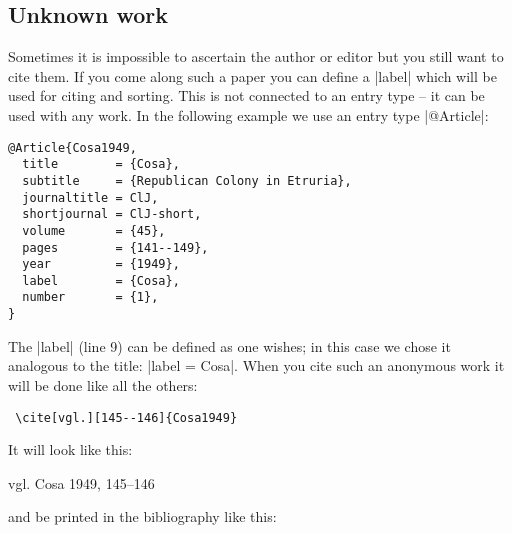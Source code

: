 \documentclass[a4paper,
10pt,
greek,
french,
spanish,
italian,
ngerman,
english
]{ltxdoc}
\begin{document}
\subsection{Unknown work}\label{unknown}
Sometimes it is impossible to ascertain the author or editor but you still want to cite them.
If you come along such a paper you can define a |label| which will be used for citing and sorting.
This is not connected to an entry type -- it can be used with any work.
In the following example we use an entry type |@Article|:
\begin{lstlisting}[style=bibentry,label=Cosa1949,caption={{@}Article\{Cosa1949,…\} }]
@Article{Cosa1949,
  title        = {Cosa},
  subtitle     = {Republican Colony in Etruria},
  journaltitle = ClJ,
  shortjournal = ClJ-short,
  volume       = {45},
  pages        = {141--149},
  year         = {1949},
  label        = {Cosa},
  number       = {1},
}
\end{lstlisting}
 The |label| (line 9) can be defined as one wishes; in this case we chose it analogous to the title: |label = {Cosa}|.
When you cite such an anonymous work it will be done like all the others:
\begin{lstlisting}
 \cite[vgl.][145--146]{Cosa1949}
\end{lstlisting}
 It will look like this:
 \begin{bsp} 
 vgl. Cosa 1949, 145--146
 \end{bsp}
and be printed in the bibliography like this:
\end{document}
